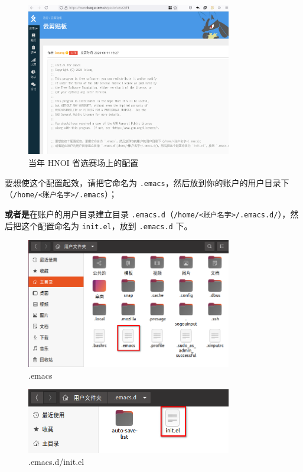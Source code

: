 \documentclass[UTF-8]{ctexart}
\begin{document}
				\begin{figure}[H]
					\centering
					\includegraphics[width=0.8\textwidth]{fig/emacs_init_el.png}
					\caption*{当年 HNOI 省选赛场上的配置}
				\end{figure}
			
				要想使这个配置起效，请把它命名为 \texttt{.emacs}，然后放到你的账户的用户目录下（\texttt{/home/<账户名字>/.emacs}）；
				
				\textbf{或者是}在账户的用户目录建立目录 \texttt{.emacs.d}（\texttt{/home/<账户名字>/.emacs.d/}），然后把这个配置命名为 \texttt{init.el}，放到 \texttt{.emacs.d} 下。
				
				\begin{figure}[H]
					\centering
					\includegraphics[width=0.8\textwidth]{fig/place_emacs.png}
					\caption*{.emacs}
				\end{figure}
			
				\begin{figure}[H]
					\centering
					\includegraphics[width=0.8\textwidth]{fig/place_init_el.png}
					\caption*{.emacs.d/init.el}
				\end{figure}
				
\end{document}
